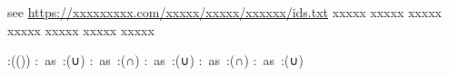 \begin{multicols}{2}
\begin{mktsEnNotes}{\mktsEnStyleMarkNotes{}\mktsEnMarkAfter{}}
{\mktsEnStyleMarkNotes{}\mktsEnMarkAfter{}}see
\url{https://xxxxxxxxx.com/xxxxx/xxxxx/xxxxxx/ids.txt} xxxxx xxxxx xxxxx
 xxxxx xxxxx xxxxx xxxxx

\end{mktsEnNotes}

\begingroup\mktsObeyAllLines{}
\cjkgGlue{}:(\cjkgGlue{}\cjkgGlue{}(\cjkgGlue{}\cjkgGlue{})\cjkgGlue{})
\cjkgGlue{}:\cjkgGlue{} as \cjkgGlue{}:({\mktsRsgFb{}∪}\cjkgGlue{})\cjkgGlue{} 
\cjkgGlue{}:\cjkgGlue{} as \cjkgGlue{}:({\mktsRsgFb{}∩}\cjkgGlue{})\cjkgGlue{} 
\cjkgGlue{}:\cjkgGlue{}\cjkgGlue{} as \cjkgGlue{}:({\mktsRsgFb{}∪}\cjkgGlue{})\cjkgGlue{} 
\cjkgGlue{}:\cjkgGlue{}\cjkgGlue{} as \cjkgGlue{}:({\mktsRsgFb{}∩}\cjkgGlue{})\cjkgGlue{} 
\cjkgGlue{}:\cjkgGlue{}\cjkgGlue{} as \cjkgGlue{}:({\mktsRsgFb{}∪}\cjkgGlue{})\cjkgGlue{} 
\endgroup{}\end{multicols}



